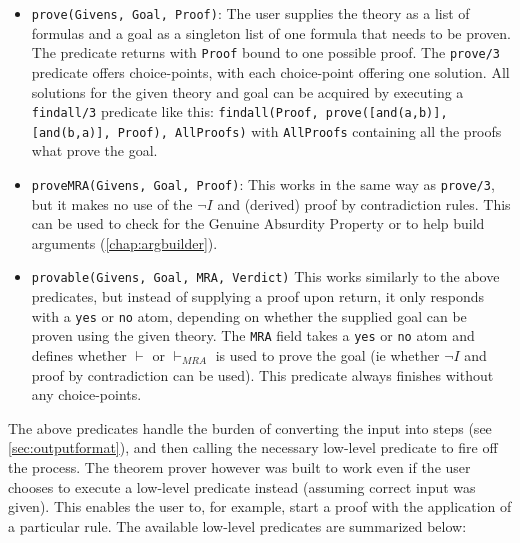 \documentclass[11pt,twoside,a4paper]{report}
\begin{document}
\begin{itemize}
\item
\lstinline$prove(Givens, Goal, Proof)$: The user supplies the theory as a list of formulas and a goal as a singleton list of one formula that needs to be proven. The predicate returns with \lstinline$Proof$ bound to one possible proof. The \lstinline$prove/3$ predicate offers choice-points, with each choice-point offering one solution. All solutions for the given theory and goal can be acquired by executing a \lstinline$findall/3$ predicate like this: \lstinline$findall(Proof, prove([and(a,b)], [and(b,a)], Proof), AllProofs)$ with \lstinline$AllProofs$ containing all the proofs what prove the goal.
\item
\lstinline$proveMRA(Givens, Goal, Proof)$: This works in the same way as \lstinline$prove/3$, but it makes no use of the $\neg I$ and (derived) proof by contradiction rules. This can be used to check for the Genuine Absurdity Property or to help build arguments (\autoref{chap:argbuilder}).
\item
\lstinline$provable(Givens, Goal, MRA, Verdict)$ This works similarly to the above predicates, but instead of supplying a proof upon return, it only responds with a \lstinline$yes$ or \lstinline$no$ atom, depending on whether the supplied goal can be proven using the given theory. The \lstinline$MRA$ field takes a \lstinline$yes$ or \lstinline$no$ atom and defines whether $\vdash$ or $\vdash_{MRA}$ is used to prove the goal (ie whether $\neg I$ and proof by contradiction can be used). This predicate always finishes without any choice-points.
\end{itemize}

The above predicates handle the burden of converting the input into steps (see \autoref{sec:outputformat}), and then calling the necessary low-level predicate to fire off the process. The theorem prover however was built to work even if the user chooses to execute a low-level predicate instead (assuming correct input was given). This enables the user to, for example, start a proof with the application of a particular rule. The available low-level predicates are summarized below:
\end{document}
